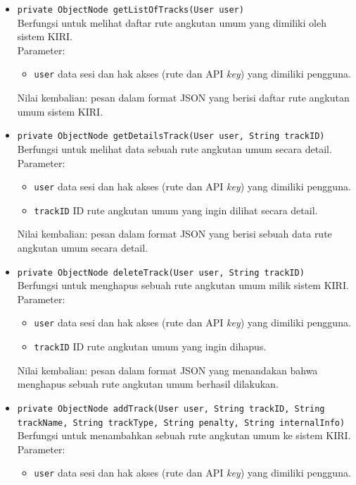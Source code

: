 \begin{itemize}
	\item \texttt{private ObjectNode getListOfTracks(User user)}\\
	Berfungsi untuk melihat daftar rute angkutan umum yang dimiliki oleh sistem KIRI.\\
	Parameter:
	\begin{itemize}
		\item \texttt{user} data sesi dan hak akses (rute dan API \textit{key}) yang dimiliki pengguna.
	\end{itemize}
	Nilai kembalian: pesan dalam format JSON yang berisi daftar rute angkutan umum sistem KIRI.
	\item \texttt{private ObjectNode getDetailsTrack(User user, String trackID)}\\
	Berfungsi untuk melihat data sebuah rute angkutan umum secara detail.\\
	Parameter:
	\begin{itemize}
		\item \texttt{user} data sesi dan hak akses (rute dan API \textit{key}) yang dimiliki pengguna.
		\item \texttt{trackID} ID rute angkutan umum yang ingin dilihat secara detail.
	\end{itemize}
	Nilai kembalian: pesan dalam format JSON yang berisi sebuah data rute angkutan umum secara detail.
	\item \texttt{private ObjectNode deleteTrack(User user, String trackID)}\\
	Berfungsi untuk menghapus sebuah rute angkutan umum milik sistem KIRI.\\
	Parameter:
	\begin{itemize}
		\item \texttt{user} data sesi dan hak akses (rute dan API \textit{key}) yang dimiliki pengguna.
		\item \texttt{trackID} ID rute angkutan umum yang ingin dihapus.
	\end{itemize}
	Nilai kembalian: pesan dalam format JSON yang menandakan bahwa menghapus sebuah rute angkutan umum berhasil dilakukan.
	\item \texttt{private ObjectNode addTrack(User user, String trackID, String trackName, String trackType, String penalty,
			String internalInfo)}\\
	Berfungsi untuk menambahkan sebuah rute angkutan umum ke sistem KIRI.\\
	Parameter:
	\begin{itemize}
		\item \texttt{user} data sesi dan hak akses (rute dan API \textit{key}) yang dimiliki pengguna.

\end{itemize}
\end{itemize}

